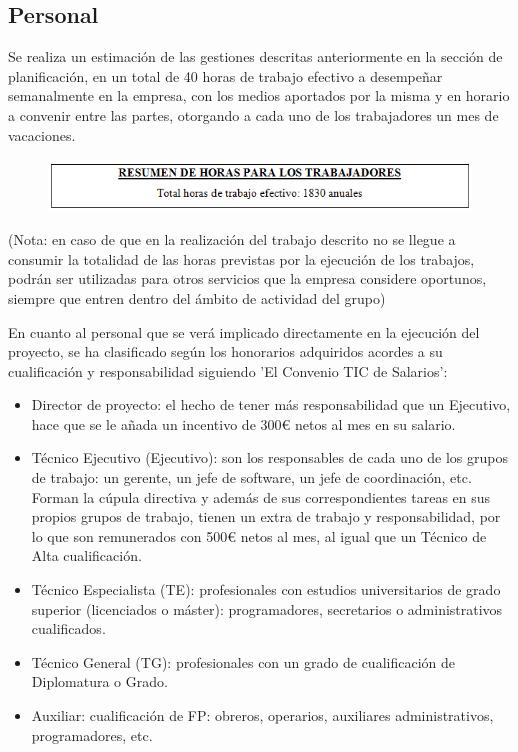 \documentclass[12pt,oneside,a4paper]{article}
\numberwithin{figure}{section}
\begin{document}
\subsection{Personal}

Se realiza un estimación de las gestiones descritas anteriormente en la sección de planificación, en un total de 40 horas de trabajo efectivo a desempeñar semanalmente en la empresa, con los medios aportados por la misma y en horario a convenir entre las partes, otorgando a cada uno de los trabajadores un mes de vacaciones.

\begin{figure}[H]
\begin{center}
\includegraphics[scale=.8]{Presupuesto2.png}
\end{center}
\end{figure}

(Nota: en caso de que en la realización del trabajo descrito no se llegue a consumir la totalidad de las horas previstas por la ejecución de los trabajos, podrán ser utilizadas para otros servicios que la empresa considere oportunos, siempre que entren dentro del ámbito de actividad del grupo)

En cuanto al personal que se verá implicado directamente en la ejecución del proyecto, se ha clasificado según los honorarios adquiridos acordes a su cualificación y responsabilidad siguiendo 'El Convenio TIC de Salarios':

\begin{itemize}\item Director de proyecto: el hecho de tener más responsabilidad que un Ejecutivo, hace que se le añada un incentivo de 300€ netos al mes en su salario.
\item Técnico Ejecutivo (Ejecutivo): son los responsables de cada uno de los grupos de trabajo: un gerente, un jefe de software, un jefe de coordinación, etc. Forman la cúpula directiva y además de sus correspondientes tareas en sus propios grupos de trabajo, tienen un extra de trabajo y responsabilidad, por lo que son remunerados con 500€ netos al mes, al igual que un Técnico de Alta cualificación.
\item Técnico Especialista (TE): profesionales con estudios universitarios de grado superior (licenciados o máster): programadores, secretarios o administrativos cualificados.
\item Técnico General (TG): profesionales con un grado de cualificación de Diplomatura o Grado.
\item Auxiliar: cualificación de FP: obreros, operarios, auxiliares administrativos, programadores, etc.
\end{itemize}
\end{document}

